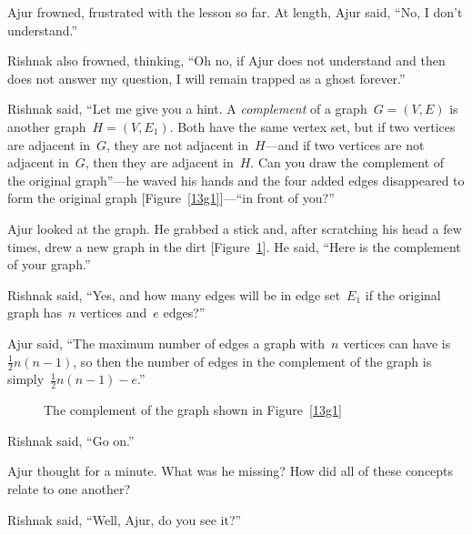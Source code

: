 Ajur frowned, frustrated with the lesson so far. At length, Ajur said, ``No, I don't understand.''

Rishnak also frowned, thinking, ``Oh no, if Ajur does not understand and then does not answer my question, I will remain trapped as a ghost forever.''

Rishnak said, ``Let me give you a hint. A \textit{complement} of a graph~$G=(V,E)$ is another graph~$H=(V,E_1)$. Both have the same vertex set, but if two vertices are adjacent in~$G$, they are not adjacent in~$H$---and if two vertices are not adjacent in~$G$, then they are adjacent in~$H$. Can you draw the complement of the original graph''---he waved his hands and the four added edges disappeared to form the original graph [Figure~\ref{13g1}]---``in front of you?'' 

Ajur looked at the graph. He grabbed a stick and, after scratching his head a few times, drew a new graph in the dirt [Figure~\ref{13g2}]. He said, ``Here is the complement of your graph.''

Rishnak said, ``Yes, and how many edges will be in edge set~$E_1$ if the original graph has~$n$ vertices and~$e$ edges?''

Ajur said, ``The maximum number of edges a graph with~$n$ vertices can have is~$\frac{1}{2}n(n-1)$, so then the number of edges in the complement of the graph is simply~$\frac{1}{2}n(n-1)-e$.''

\begin{figure}
\begin{center}
\caption{The complement of the graph shown in Figure~\ref{13g1}}\label{13g2}
\end{center}
\end{figure}

Rishnak said, ``Go on.''

Ajur thought for a minute. What was he missing? How did all of these concepts relate to one another?

Rishnak said, ``Well, Ajur, do you see it?''

